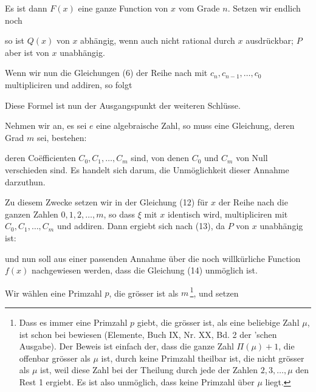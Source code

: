 Es ist dann $F(x)$ eine ganze Function von $x$ vom Grade $n$. Setzen wir endlich noch



so ist $Q(x)$ von $x$ abhängig, wenn auch nicht rational durch $x$ ausdrückbar; $P$ aber ist von $x$ unabhängig.

Wenn wir nun die Gleichungen (6) der Reihe nach mit $c_n, c_{n-1},\ldots, c_0$ multipliciren und addiren, so folgt


Diese Formel ist nun der Ausgangspunkt der weiteren Schlüsse.

Nehmen wir an, es sei $e$ eine algebraische Zahl, so muss eine Gleichung, deren Grad $m$ sei, bestehen:


deren Coëfficienten $C_0, C_1, \ldots, C_m$  sind, von denen $C_0$ und $C_m$ von Null verschieden sind. Es handelt sich darum, die Unmöglichkeit dieser Annahme darzuthun.

Zu diesem Zwecke setzen wir in der Gleichung (12) für $x$ der Reihe nach die ganzen Zahlen $0,1,2,\ldots,m$, so dass $\xi$ mit $x$ identisch wird, multipliciren mit $C_0, C_1, \ldots, C_m$ und addiren. Dann ergiebt sich nach (13), da $P$ von $x$ unabhängig ist:


und nun soll aus einer passenden Annahme über die noch willkürliche Function $f(x)$ nachgewiesen werden, dass die Gleichung (14) unmöglich ist.

Wir wählen eine Primzahl $p$, die grösser ist als $m$\,\footnote{Dass es immer eine Primzahl $p$ giebt, die grösser ist, als eine beliebige Zahl $\mu$, ist schon bei  bewiesen (Elemente, Buch IX, Nr. XX, Bd. 2 der 'schen Ausgabe). Der Beweis ist einfach der, dass die ganze Zahl $\Pi(\mu)+1$, die offenbar grösser als $\mu$ ist, durch keine Primzahl theilbar ist, die nicht grösser als $\mu$ ist, weil diese Zahl bei der Theilung durch jede der Zahlen $2,3,\ldots,\mu$ den Rest 1 ergiebt. Es ist also unmöglich, dass keine Primzahl über $\mu$ liegt.}, und setzen

